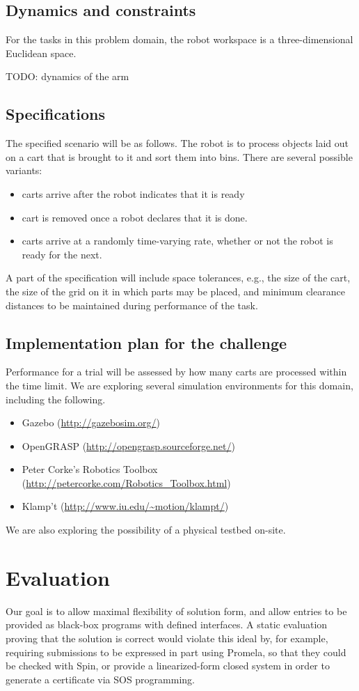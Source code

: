 \documentclass{amsart}
\theoremstyle{definition}
\begin{document}
\subsection{Dynamics and constraints}
For the tasks in this problem domain, the robot workspace is a three-dimensional
Euclidean space.

TODO: dynamics of the arm


\subsection{Specifications}
The specified scenario will be as follows. The robot is to process objects laid out on a cart that 
is brought to it and sort them into bins. There are several possible variants:
\begin{itemize}
\item carts arrive after the robot indicates that it is ready
\item cart is removed once a robot declares that it is done.
\item carts arrive at a randomly time-varying rate, whether or not the robot is ready for the next.
\end{itemize}
A part of the specification will include space tolerances, e.g., the size of the
cart, the size of the grid on it in which parts may be placed, and minimum
clearance distances to be maintained during performance of the task.


\subsection{Implementation plan for the challenge}

Performance for a trial will be assessed by how many carts are processed within the time limit.
We are exploring several simulation environments for this domain, including the following.
\begin{itemize}
\item Gazebo (\url{http://gazebosim.org/})
\item OpenGRASP (\url{http://opengrasp.sourceforge.net/})
\item Peter Corke's Robotics Toolbox
(\url{http://petercorke.com/Robotics_Toolbox.html})
\item Klamp't (\url{http://www.iu.edu/~motion/klampt/})
\end{itemize}

We are also exploring the possibility of a physical testbed on-site.

\section{Evaluation}
Our goal is to allow maximal flexibility of solution form, and allow entries to be provided as black-box 
programs with defined interfaces. A static evaluation proving that the solution is correct would violate this 
ideal by, for example, requiring submissions to be expressed in part using Promela, so that they could be 
checked with Spin, or provide a linearized-form closed system in order to generate a certificate via SOS
programming.
\end{document}
